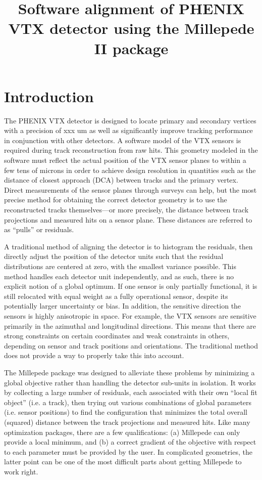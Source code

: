 \documentclass[12pt]{article}
\title{\sffamily\bfseries{Software alignment of PHENIX VTX detector using the Millepede II package}}
\author{\sffamily{Andrew Adare, Darren McGlinchey, Jin Huang, Jamie Nagle}}
\date{\sffamily{\today}}
\begin{document}
\maketitle
\section{Introduction}
The PHENIX VTX detector is designed to locate primary and secondary vertices with a precision of xxx um as well as significantly improve tracking performance in conjunction with other detectors. A software model of the VTX sensors is required during track reconstruction from raw hits. This geometry modeled in the software must reflect the actual position of the VTX sensor planes to within a few tens of microns in order to achieve design resolution in quantities such as the distance of closest approach (DCA) between tracks and the primary vertex. Direct measurements of the sensor planes through surveys can help, but the most precise method for obtaining the correct detector geometry is to use the reconstructed tracks themselves---or more precisely, the distance between track projections and measured hits on a sensor plane. These distances are referred to as ``pulls'' or residuals.

A traditional method of aligning the detector is to histogram the residuals, then directly adjust the position of the detector units such that the residual distributions are centered at zero, with the smallest variance possible. This method handles each detector unit independently, and as such, there is no explicit notion of a global optimum. If one sensor is only partially functional, it is still relocated with equal weight as a fully operational sensor, despite its potentially larger uncertainty or bias. In addition, the sensitive direction the sensors is highly anisotropic in space. For example, the VTX sensors are sensitive primarily in the azimuthal and longitudinal directions. This means that there are strong constraints on certain coordinates and weak constraints in others, depending on sensor and track positions and orientations. The traditional method does not provide a way to properly take this into account.

The Millepede package was designed to alleviate these problems by minimizing a global objective rather than handling the detector sub-units in isolation. It works by collecting a large number of residuals, each associated with their own ``local fit object'' (i.e. a track), then trying out various combinations of global parameters (i.e. sensor positions) to find the configuration that minimizes the total overall (squared) distance between the track projections and measured hits. Like many optimization packages, there are a few qualifications: (a) Millepede can only provide a local minimum, and (b) a correct gradient of the objective with respect to each parameter must be provided by the user. In complicated geometries, the latter point can be one of the most difficult parts about getting Millepede to work right.
\end{document}
